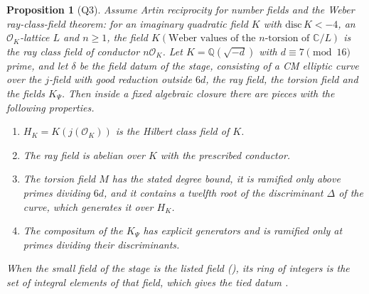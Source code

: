 \documentclass[11pt]{article}
\newtheorem{proposition}[theorem]{Proposition}
\theoremstyle{remark}
\begin{document}
\begin{proposition}[Q3]\label{prop:Q3}
Assume Artin reciprocity for number fields and the Weber ray-class-field theorem: for an imaginary quadratic field $K$ with $\mathrm{disc}\,K<-4$, an $\mathcal O_K$-lattice $L$ and $n\geq1$, the field $K(\text{Weber values of the }n\text{-torsion of }\mathbb C/L)$ is the ray class field of conductor $n\mathcal O_K$. Let $K=\mathbb Q(\sqrt{-d})$ with $d\equiv7\pmod{16}$ prime, and let $\delta$ be the field datum of the stage, consisting of a CM elliptic curve over the $j$-field with good reduction outside $6d$, the ray field, the torsion field and the fields $K_\Psi$. Then inside a fixed algebraic closure there are pieces with the following properties.
\begin{enumerate}[label=(\roman*),itemsep=1pt]
\item $H_K=K(j(\mathcal O_K))$ is the Hilbert class field of $K$.
\item The ray field is abelian over $K$ with the prescribed conductor.
\item The torsion field $M$ has the stated degree bound, it is ramified only above primes dividing $6d$, and it contains a twelfth root of the discriminant $\Delta$ of the curve, which generates it over $H_K$.
\item The compositum of the $K_\Psi$ has explicit generators and is ramified only at primes dividing their discriminants.
\end{enumerate}
When the small field of the stage is the listed field (), its ring of integers is the set of integral elements of that field, which gives the tied datum .
\end{proposition}
\end{document}
